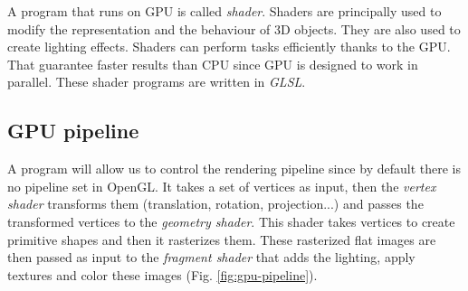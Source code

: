 A program that runs on GPU is called \textit{shader}. Shaders are principally used to modify the representation and the behaviour of 3D objects. They are also used to create lighting effects. Shaders can perform tasks efficiently thanks to the GPU. That guarantee faster results than CPU since GPU is designed to work in parallel.
These shader programs are written in \textit{GLSL}.

\subsection{GPU pipeline}
A program will allow us to control the rendering pipeline since by default there is no pipeline set in OpenGL. It takes a set of vertices as input, then the \textit{vertex shader} transforms them (translation, rotation, projection...) and passes the transformed vertices to the \textit{geometry shader}. This shader takes vertices to create primitive shapes and then it rasterizes them. These rasterized flat images are then passed as input to the \textit{fragment shader} that adds the lighting, apply textures and color these images (Fig. \ref{fig:gpu-pipeline}).

